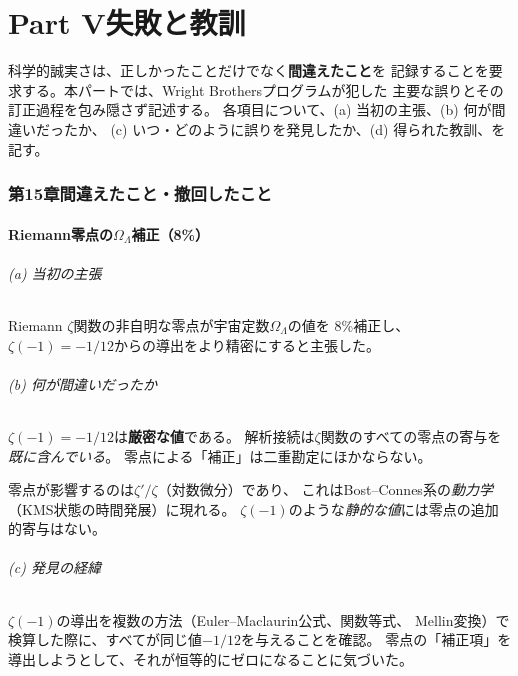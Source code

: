 \newpage
\part*{Part V\quad 失敗と教訓}

\vspace{1em}
\noindent
科学的誠実さは、正しかったことだけでなく\textbf{間違えたこと}を
記録することを要求する。本パートでは、Wright Brothersプログラムが犯した
主要な誤りとその訂正過程を包み隠さず記述する。
各項目について、(a) 当初の主張、(b) 何が間違いだったか、
(c) いつ・どのように誤りを発見したか、(d) 得られた教訓、を記す。



\section{第15章\quad 間違えたこと・撤回したこと}
\label{ch:failures}

\subsection{Riemann零点の$\Omega_\Lambda$補正（8\%）}
\label{sec:15.1}

\paragraph{(a) 当初の主張}
Riemann $\zeta$関数の非自明な零点が宇宙定数$\Omega_\Lambda$の値を
8\%補正し、$\zeta(-1) = -1/12$からの導出をより精密にすると主張した。

\paragraph{(b) 何が間違いだったか}
$\zeta(-1) = -1/12$は\textbf{厳密な値}である。
解析接続は$\zeta$関数のすべての零点の寄与を\emph{既に含んでいる}。
零点による「補正」は二重勘定にほかならない。

零点が影響するのは$\zeta'/\zeta$（対数微分）であり、
これはBost--Connes系の\emph{動力学}（KMS状態の時間発展）に現れる。
$\zeta(-1)$のような\emph{静的な値}には零点の追加的寄与はない。

\paragraph{(c) 発見の経緯}
$\zeta(-1)$の導出を複数の方法（Euler--Maclaurin公式、関数等式、
Mellin変換）で検算した際に、すべてが同じ値$-1/12$を与えることを確認。
零点の「補正項」を導出しようとして、それが恒等的にゼロになることに気づいた。

